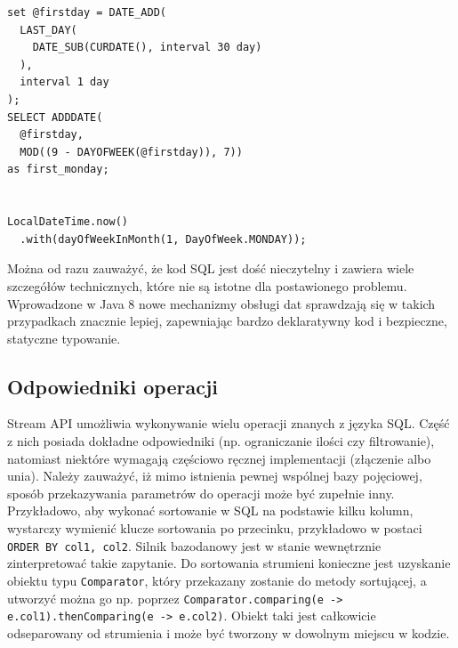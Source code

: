 \documentclass[12pt,twoside,openright]{extarticle}
\begin{document}
\begin{lstlisting}[label=date, caption=Problem znalezienia pierwszego poniedziałku w miesiącu]
set @firstday = DATE_ADD(
  LAST_DAY(
    DATE_SUB(CURDATE(), interval 30 day)
  ),
  interval 1 day
);
SELECT ADDDATE(
  @firstday,
  MOD((9 - DAYOFWEEK(@firstday)), 7))
as first_monday;


LocalDateTime.now()
  .with(dayOfWeekInMonth(1, DayOfWeek.MONDAY));
\end{lstlisting}

Można od razu zauważyć, że kod SQL jest dość nieczytelny i zawiera wiele szczegółów technicznych, które nie są istotne dla postawionego problemu. Wprowadzone w Java 8 nowe mechanizmy obsługi dat sprawdzają się w takich przypadkach znacznie lepiej, zapewniając bardzo deklaratywny kod i bezpieczne, statyczne typowanie.


\subsection{Odpowiedniki operacji} \label{counterparts}

    Stream API umożliwia wykonywanie wielu operacji znanych z języka SQL. Część z nich posiada dokładne odpowiedniki (np. ograniczanie ilości czy filtrowanie), natomiast niektóre wymagają częściowo ręcznej implementacji (złączenie albo unia). Należy zauważyć, iż mimo istnienia pewnej wspólnej bazy pojęciowej, sposób przekazywania parametrów do operacji może być zupełnie inny. Przykładowo, aby wykonać sortowanie w SQL na podstawie kilku kolumn, wystarczy wymienić klucze sortowania po przecinku, przykładowo w postaci \texttt{ORDER BY col1, col2}. Silnik bazodanowy jest w stanie wewnętrznie zinterpretować takie zapytanie. Do sortowania strumieni konieczne jest uzyskanie obiektu typu \texttt{Comparator}, który przekazany zostanie do metody sortującej, a utworzyć można go np. poprzez \texttt{Comparator.comparing(e -> e.col1).thenComparing(e -> e.col2)}. Obiekt taki jest całkowicie odseparowany od strumienia i może być tworzony w dowolnym miejscu w kodzie.
\end{document}
